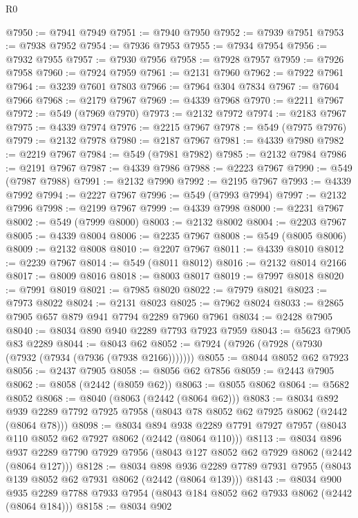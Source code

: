 \begin{lexlean}{R0}
\begin{coremodule}
@7950 := @7941 @7949
@7951 := @7940 @7950
@7952 := @7939 @7951
@7953 := @7938 @7952
@7954 := @7936 @7953
@7955 := @7934 @7954
@7956 := @7932 @7955
@7957 := @7930 @7956
@7958 := @7928 @7957
@7959 := @7926 @7958
@7960 := @7924 @7959
@7961 := @2131 @7960
@7962 := @7922 @7961
@7964 := @3239 @7601 @7803
@7966 := @7964 @304 @7834
@7967 := @7604 @7966
@7968 := @2179 @7967
@7969 := @4339 @7968
@7970 := @2211 @7967
@7972 := @549 (@7969 @7970)
@7973 := @2132 @7972
@7974 := @2183 @7967
@7975 := @4339 @7974
@7976 := @2215 @7967
@7978 := @549 (@7975 @7976)
@7979 := @2132 @7978
@7980 := @2187 @7967
@7981 := @4339 @7980
@7982 := @2219 @7967
@7984 := @549 (@7981 @7982)
@7985 := @2132 @7984
@7986 := @2191 @7967
@7987 := @4339 @7986
@7988 := @2223 @7967
@7990 := @549 (@7987 @7988)
@7991 := @2132 @7990
@7992 := @2195 @7967
@7993 := @4339 @7992
@7994 := @2227 @7967
@7996 := @549 (@7993 @7994)
@7997 := @2132 @7996
@7998 := @2199 @7967
@7999 := @4339 @7998
@8000 := @2231 @7967
@8002 := @549 (@7999 @8000)
@8003 := @2132 @8002
@8004 := @2203 @7967
@8005 := @4339 @8004
@8006 := @2235 @7967
@8008 := @549 (@8005 @8006)
@8009 := @2132 @8008
@8010 := @2207 @7967
@8011 := @4339 @8010
@8012 := @2239 @7967
@8014 := @549 (@8011 @8012)
@8016 := @2132 @8014 @2166
@8017 := @8009 @8016
@8018 := @8003 @8017
@8019 := @7997 @8018
@8020 := @7991 @8019
@8021 := @7985 @8020
@8022 := @7979 @8021
@8023 := @7973 @8022
@8024 := @2131 @8023
@8025 := @7962 @8024
@8033 := @2865 @7905 @657 @879 @941 @7794 @2289 @7960 @7961
@8034 := @2428 @7905
@8040 := @8034 @890 @940 @2289 @7793 @7923 @7959
@8043 := @5623 @7905 @83 @2289
@8044 := @8043 @62
@8052 := @7924 (@7926 (@7928 (@7930 (@7932 (@7934 (@7936 (@7938 @2166)))))))
@8055 := @8044 @8052 @62 @7923
@8056 := @2437 @7905
@8058 := @8056 @62 @7856
@8059 := @2443 @7905
@8062 := @8058 (@2442 (@8059 @62))
@8063 := @8055 @8062
@8064 := @5682 @8052
@8068 := @8040 (@8063 (@2442 (@8064 @62)))
@8083 := @8034
    @892
    @939
    @2289
    @7792
    @7925
    @7958
    (@8043 @78 @8052 @62 @7925 @8062 (@2442 (@8064 @78)))
@8098 := @8034
    @894
    @938
    @2289
    @7791
    @7927
    @7957
    (@8043 @110 @8052 @62 @7927 @8062 (@2442 (@8064 @110)))
@8113 := @8034
    @896
    @937
    @2289
    @7790
    @7929
    @7956
    (@8043 @127 @8052 @62 @7929 @8062 (@2442 (@8064 @127)))
@8128 := @8034
    @898
    @936
    @2289
    @7789
    @7931
    @7955
    (@8043 @139 @8052 @62 @7931 @8062 (@2442 (@8064 @139)))
@8143 := @8034
    @900
    @935
    @2289
    @7788
    @7933
    @7954
    (@8043 @184 @8052 @62 @7933 @8062 (@2442 (@8064 @184)))
@8158 := @8034
    @902

\end{coremodule}
\end{lexlean}
